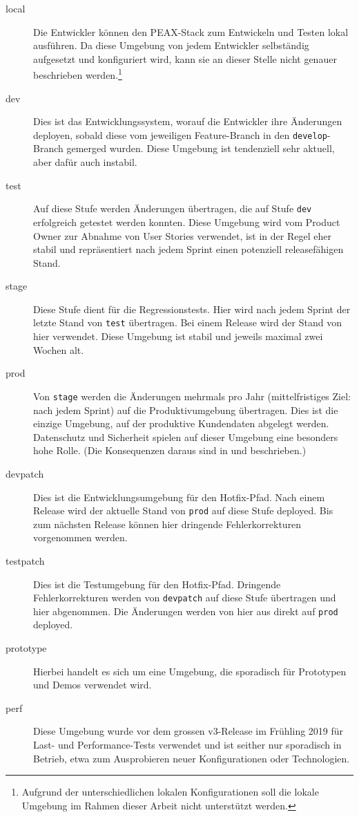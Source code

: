 \begin{description}
    \item[local] Die Entwickler können den PEAX-Stack zum Entwickeln und Testen lokal ausführen. Da diese Umgebung von jedem Entwickler selbständig aufgesetzt und konfiguriert wird, kann sie an dieser Stelle nicht genauer beschrieben werden.\footnote{Aufgrund der unterschiedlichen lokalen Konfigurationen soll die lokale Umgebung im Rahmen dieser Arbeit nicht unterstützt werden.}
    \item[dev] Dies ist das Entwicklungssystem, worauf die Entwickler ihre Änderungen deployen, sobald diese vom jeweiligen Feature-Branch in den \texttt{develop}-Branch gemerged wurden. Diese Umgebung ist tendenziell sehr aktuell, aber dafür auch instabil.
    \item[test] Auf diese Stufe werden Änderungen übertragen, die auf Stufe \texttt{dev} erfolgreich getestet werden konnten. Diese Umgebung wird vom Product Owner zur Abnahme von User Stories verwendet, ist in der Regel eher stabil und repräsentiert nach jedem Sprint einen potenziell releasefähigen Stand.
    \item[stage] Diese Stufe dient für die Regressionstests. Hier wird nach jedem Sprint der letzte Stand von \texttt{test} übertragen. Bei einem Release wird der Stand von hier verwendet. Diese Umgebung ist stabil und jeweils maximal zwei Wochen alt.
    \item[prod] Von \texttt{stage} werden die Änderungen mehrmals pro Jahr (mittelfristiges Ziel: nach jedem Sprint) auf die Produktivumgebung übertragen. Dies ist die einzige Umgebung, auf der produktive Kundendaten abgelegt werden. Datenschutz und Sicherheit spielen auf dieser Umgebung eine besonders hohe Rolle. (Die Konsequenzen daraus sind in  und  beschrieben.)
    \item[devpatch] Dies ist die Entwicklungsumgebung für den Hotfix-Pfad. Nach einem Release wird der aktuelle Stand von \texttt{prod} auf diese Stufe deployed. Bis zum nächsten Release können hier dringende Fehlerkorrekturen vorgenommen werden.
    \item[testpatch] Dies ist die Testumgebung für den Hotfix-Pfad. Dringende Fehlerkorrekturen werden von \texttt{devpatch} auf diese Stufe übertragen und hier abgenommen. Die Änderungen werden von hier aus direkt auf \texttt{prod} deployed.
    \item[prototype] Hierbei handelt es sich um eine Umgebung, die sporadisch für Prototypen und Demos verwendet wird.
    \item[perf] Diese Umgebung wurde vor dem grossen v3-Release im Frühling 2019 für Last- und Performance-Tests verwendet und ist seither nur sporadisch in Betrieb, etwa zum Ausprobieren neuer Konfigurationen oder Technologien.
\end{description}

